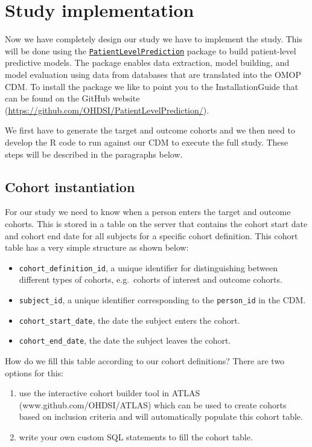 \documentclass[]{book}
\providecommand{\tightlist}{%
  \setlength{\itemsep}{0pt}\setlength{\parskip}{0pt}}
\begin{document}
\section{Study implementation}\label{study-implementation}

Now we have completely design our study we have to implement the study.
This will be done using the
\href{http://github.com/OHDSI/PatientLevelPrediction}{\texttt{PatientLevelPrediction}}
package to build patient-level predictive models. The package enables
data extraction, model building, and model evaluation using data from
databases that are translated into the OMOP CDM. To install the package
we like to point you to the InstallationGuide that can be found on the
GitHub website (\url{https://github.com/OHDSI/PatientLevelPrediction/}).

We first have to generate the target and outcome cohorts and we then
need to develop the R code to run against our CDM to execute the full
study. These steps will be described in the paragraphs below.

\subsection{Cohort instantiation}\label{cohort-instantiation}

For our study we need to know when a person enters the target and
outcome cohorts. This is stored in a table on the server that contains
the cohort start date and cohort end date for all subjects for a
specific cohort definition. This cohort table has a very simple
structure as shown below:

\begin{itemize}
\tightlist
\item
  \texttt{cohort\_definition\_id}, a unique identifier for
  distinguishing between different types of cohorts, e.g.~cohorts of
  interest and outcome cohorts.
\item
  \texttt{subject\_id}, a unique identifier corresponding to the
  \texttt{person\_id} in the CDM.
\item
  \texttt{cohort\_start\_date}, the date the subject enters the cohort.
\item
  \texttt{cohort\_end\_date}, the date the subject leaves the cohort.
\end{itemize}

How do we fill this table according to our cohort definitions? There are
two options for this:

\begin{enumerate}
\def\labelenumi{\arabic{enumi})}
\item
  use the interactive cohort builder tool in ATLAS
  (www.github.com/OHDSI/ATLAS) which can be used to create cohorts based
  on inclusion criteria and will automatically populate this cohort
  table.
\item
  write your own custom SQL statements to fill the cohort table.
\end{enumerate}
\end{document}

